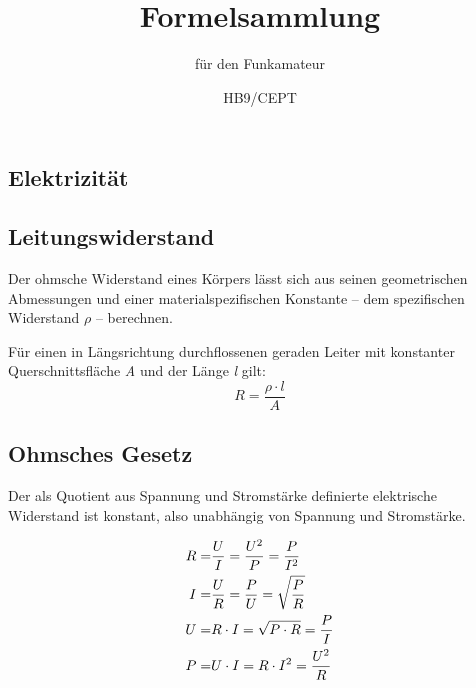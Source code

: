 \documentclass[10pt,landscape]{scrartcl}
\author{HB9/CEPT}
\date{}
\title{Formelsammlung}
\subtitle{für den Funkamateur}
\begin{document}
\setlength{\columnseprule}{.25pt}
\setlength{\columnsep}{2cm}
\begin{multicols}{3}

\maketitle

\section{Elektrizität}

\noindent
{}

\subsection*{Leitungswiderstand}
Der ohmsche Widerstand eines Körpers lässt sich aus seinen geometrischen Abmessungen und einer materialspezifischen Konstante -- dem spezifischen Widerstand $\rho$ -- berechnen.

Für einen in Längsrichtung durchflossenen geraden Leiter mit konstanter Querschnittsfläche \textit{A} und der Länge \textit{l} gilt:
$$ R = \frac{\rho \cdot l}{A} $$


\subsection*{Ohmsches Gesetz}
Der als Quotient aus Spannung und Stromstärke definierte elektrische Widerstand ist konstant, also unabhängig von Spannung und Stromstärke.

\begin{align*}
R =& \frac{U}{I} = \frac{U^2}{P} = \frac{P}{I^2} \\
I =& \frac{U}{R} = \frac{P}{U} = \sqrt{P \over R} \\
U =& R \cdot I = \sqrt{P\cdot R} = \frac{P}{I} \\
P =& U \cdot I = R \cdot I^2 = \frac{U^2}{R}
\end{align*}


\end{multicols}
\end{document}
